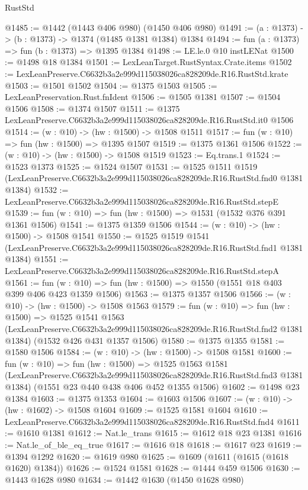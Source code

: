 \begin{lexlean}{RustStd}
\begin{coremodule}
@1485 := @1442 (@1443 @406 @980) (@1450 @406 @980)
@1491 := (a : @1373) -> (b : @1373) -> @1374 (@1485 @1381 @1384) @1384
@1494 := fun (a : @1373) => fun (b : @1373) => @1395 @1384
@1498 := LE.le.{0} @10 instLENat
@1500 := @1498 @18 @1384
@1501 := LexLeanTarget.RustSyntax.Crate.items
@1502 := LexLeanPreserve.C6632b3a2e999d115038026ca828209de.R16.RustStd.krate
@1503 := @1501 @1502
@1504 := @1375 @1503
@1505 := LexLeanPreservation.Rust.fnIdent
@1506 := @1505 @1381
@1507 := @1504 @1506
@1508 := @1374 @1507
@1511 := @1375 LexLeanPreserve.C6632b3a2e999d115038026ca828209de.R16.RustStd.it0 @1506
@1514 := (w : @10) -> (hw : @1500) -> @1508 @1511
@1517 := fun (w : @10) => fun (hw : @1500) => @1395 @1507
@1519 := @1375 @1361 @1506
@1522 := (w : @10) -> (hw : @1500) -> @1508 @1519
@1523 := Eq.trans.{1}
@1524 := @1523 @1373
@1525 := @1524 @1507
@1531 := @1525
    @1511
    @1519
    (LexLeanPreserve.C6632b3a2e999d115038026ca828209de.R16.RustStd.fnd0 @1381 @1384)
@1532 := LexLeanPreserve.C6632b3a2e999d115038026ca828209de.R16.RustStd.stepE
@1539 := fun (w : @10) => fun (hw : @1500) => @1531 (@1532 @376 @391 @1361 @1506)
@1541 := @1375 @1359 @1506
@1544 := (w : @10) -> (hw : @1500) -> @1508 @1541
@1550 := @1525
    @1519
    @1541
    (LexLeanPreserve.C6632b3a2e999d115038026ca828209de.R16.RustStd.fnd1 @1381 @1384)
@1551 := LexLeanPreserve.C6632b3a2e999d115038026ca828209de.R16.RustStd.stepA
@1561 := fun (w : @10) => fun (hw : @1500) => @1550 (@1551 @18 @403 @399 @406 @423 @1359 @1506)
@1563 := @1375 @1357 @1506
@1566 := (w : @10) -> (hw : @1500) -> @1508 @1563
@1579 := fun (w : @10) =>
  fun (hw : @1500) =>
  @1525
    @1541
    @1563
    (LexLeanPreserve.C6632b3a2e999d115038026ca828209de.R16.RustStd.fnd2 @1381 @1384)
    (@1532 @426 @431 @1357 @1506)
@1580 := @1375 @1355
@1581 := @1580 @1506
@1584 := (w : @10) -> (hw : @1500) -> @1508 @1581
@1600 := fun (w : @10) =>
  fun (hw : @1500) =>
  @1525
    @1563
    @1581
    (LexLeanPreserve.C6632b3a2e999d115038026ca828209de.R16.RustStd.fnd3 @1381 @1384)
    (@1551 @23 @440 @438 @406 @452 @1355 @1506)
@1602 := @1498 @23 @1384
@1603 := @1375 @1353
@1604 := @1603 @1506
@1607 := (w : @10) -> (hw : @1602) -> @1508 @1604
@1609 := @1525 @1581 @1604
@1610 := LexLeanPreserve.C6632b3a2e999d115038026ca828209de.R16.RustStd.fnd4
@1611 := @1610 @1381
@1612 := Nat.le_trans
@1615 := @1612 @18 @23 @1381
@1616 := Nat.le_of_ble_eq_true
@1617 := @1616 @18
@1618 := @1617 @23
@1619 := @1394 @1292
@1620 := @1619 @980
@1625 := @1609 (@1611 (@1615 (@1618 @1620) @1384))
@1626 := @1524 @1581
@1628 := @1444 @459 @1506
@1630 := @1443 @1628 @980
@1634 := @1442 @1630 (@1450 @1628 @980)

\end{coremodule}
\end{lexlean}
